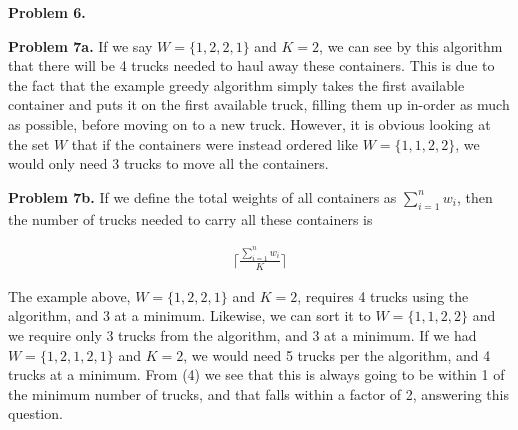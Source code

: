 \documentclass{article}
\begin{document}
\hfill

\textbf{Problem 6.} 

\hfill

\textbf{Problem 7a.} If we say $W = \{1, 2, 2, 1\}$ and $K = 2$, we can see by this algorithm that there will be 4 trucks needed to haul away these containers. This is due to the fact that the example greedy algorithm simply takes the first available container and puts it on the first available truck, filling them up in-order as much as possible, before moving on to a new truck. However, it is obvious looking at the set $W$ that if the containers were instead ordered like $W = \{1, 1, 2, 2\}$, we would only need 3 trucks to move all the containers.

\hfill

\textbf{Problem 7b.} If we define the total weights of all containers as $\sum_{i=1}^{n} w_i$, then the number of trucks needed to carry all these containers is 

\begin{gather}
    \lceil \frac{\sum_{i=1}^{n} w_i}{K} \rceil
\end{gather}

The example above, $W = \{1, 2, 2, 1\}$ and $K = 2$, requires 4 trucks using the algorithm, and 3 at a minimum. Likewise, we can sort it to $W = \{1, 1, 2, 2\}$ and we require only 3 trucks from the algorithm, and 3 at a minimum. If we had $W = \{1, 2, 1, 2, 1\}$ and $K = 2$, we would need 5 trucks per the algorithm, and 4 trucks at a minimum. From (4) we see that this is always going to be within 1 of the minimum number of trucks, and that falls within a factor of 2, answering this question.

\newpage
 

\end{document}
